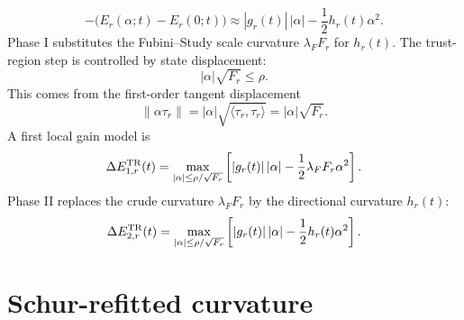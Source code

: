\documentclass[10pt,twocolumn]{article}
\begin{document}
\begin{equation}
-\bigl(E_r(\alpha;t)-E_r(0;t)\bigr)
\approx |g_r(t)|\,|\alpha|-\frac12h_r(t)\alpha^2.
\label{eq:p1_drop_model}
\end{equation}
Phase I substitutes the Fubini--Study scale curvature \(\lambda_FF_r\) for \(h_r(t)\). The trust-region step is controlled by state displacement:
\begin{equation}
|\alpha|\sqrt{F_r}\le\rho.
\label{eq:p1_tr_radius}
\end{equation}
This comes from the first-order tangent displacement
\begin{equation}
\|\alpha\tau_r\|=|\alpha|\sqrt{\langle\tau_r,\tau_r\rangle}
=|\alpha|\sqrt{F_r}.
\label{eq:p1_state_displacement}
\end{equation}
A first local gain model is
\begin{equation}
\Delta E_{1,r}^{\rm TR}(t)=
\max_{|\alpha|\le\rho/\sqrt{F_r}}
\left[|g_r(t)|\,|\alpha|-\frac12\lambda_FF_r\alpha^2\right].
\label{eq:p1_phase1_gain}
\end{equation}
Phase II replaces the crude curvature \(\lambda_FF_r\) by the directional curvature \(h_r(t)\):
\begin{equation}
\Delta E_{2,r}^{\rm TR}(t)=
\max_{|\alpha|\le\rho/\sqrt{F_r}}
\left[|g_r(t)|\,|\alpha|-\frac12h_r(t)\alpha^2\right].
\label{eq:p1_phase2_gain}
\end{equation}

\section{Schur-refitted curvature}
\end{document}
